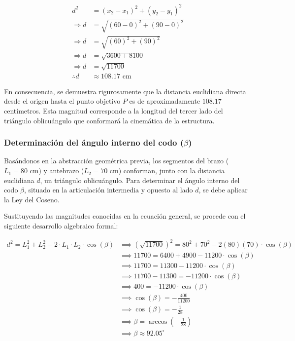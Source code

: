 \documentclass[12pt]{article}
\begin{document}
\begin{align*}
    d^2 &= (x_2 - x_1)^2 + (y_2 - y_1)^2 \\
    \Rightarrow d &= \sqrt{(60 - 0)^2 + (90 - 0)^2} \\
    \Rightarrow d &= \sqrt{(60)^2 + (90)^2} \\
    \Rightarrow d &= \sqrt{3600 + 8100} \\
    \Rightarrow d &= \sqrt{11700} \\
    \therefore d &\approx 108.17 \text{ cm}
\end{align*}

En consecuencia, se demuestra rigurosamente que la distancia euclidiana directa desde el origen hasta el punto objetivo $P$ es de aproximadamente $108.17$ centímetros. Esta magnitud corresponde a la longitud del tercer lado del triángulo oblicuángulo que conformará la cinemática de la estructura.

\subsubsection{Determinación del ángulo interno del codo ($\beta$)}

Basándonos en la abstracción geométrica previa, los segmentos del brazo ($L_1 = 80 \text{ cm}$) y antebrazo ($L_2 = 70 \text{ cm}$) conforman, junto con la distancia euclidiana $d$, un triángulo oblicuángulo. Para determinar el ángulo interno del codo $\beta$, situado en la articulación intermedia y opuesto al lado $d$, se debe aplicar la Ley del Coseno. 

\newpage

Sustituyendo las magnitudes conocidas en la ecuación general, se procede con el siguiente desarrollo algebraico formal:

\begin{align*}
    d^2 = L_1^2 + L_2^2 - 2 \cdot L_1 \cdot L_2 \cdot \cos(\beta) &\implies (\sqrt{11700})^2 = 80^2 + 70^2 - 2(80)(70) \cdot \cos(\beta) \\
    &\implies 11700 = 6400 + 4900 - 11200 \cdot \cos(\beta) \\
    &\implies 11700 = 11300 - 11200 \cdot \cos(\beta) \\
    &\implies 11700 - 11300 = -11200 \cdot \cos(\beta) \\
    &\implies 400 = -11200 \cdot \cos(\beta) \\
    &\implies \cos(\beta) = -\frac{400}{11200} \\
    &\implies \cos(\beta) = -\frac{1}{28} \\
    &\implies \beta = \arccos\left(-\frac{1}{28}\right) \\
    &\implies \beta \approx 92.05^\circ
\end{align*}
\end{document}

